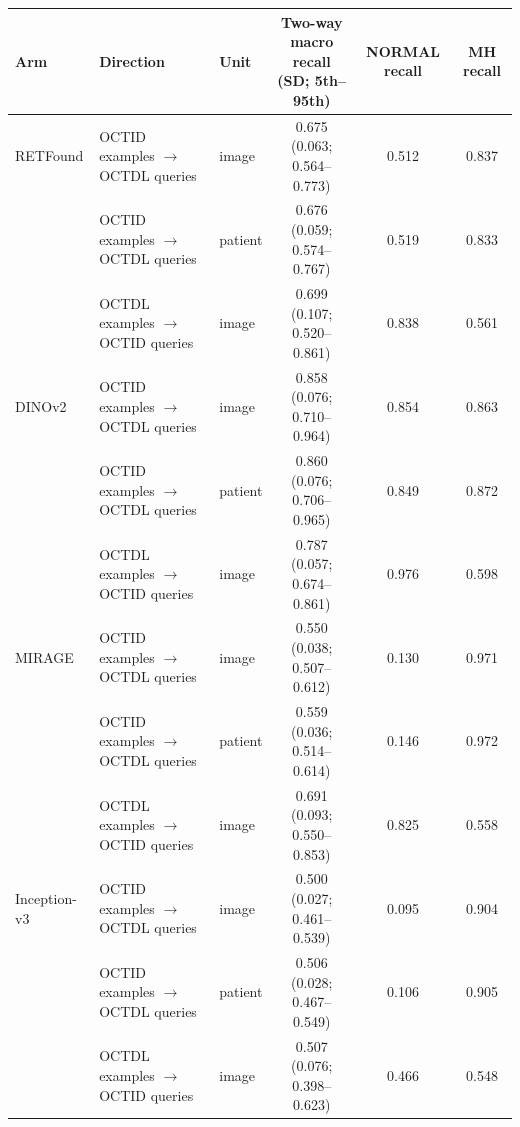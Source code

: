 \begin{tabular}{@{}lllccc@{}}
\toprule
Arm & Direction & Unit & \makecell{Two-way macro recall\\(SD; 5th--95th)} & NORMAL recall & MH recall \\
\midrule
RETFound & OCTID examples $\to$ OCTDL queries & image & 0.675 (0.063; 0.564--0.773) & 0.512 & 0.837 \\
 & OCTID examples $\to$ OCTDL queries & patient & 0.676 (0.059; 0.574--0.767) & 0.519 & 0.833 \\
 & OCTDL examples $\to$ OCTID queries & image & 0.699 (0.107; 0.520--0.861) & 0.838 & 0.561 \\
\addlinespace[2pt]
DINOv2 & OCTID examples $\to$ OCTDL queries & image & 0.858 (0.076; 0.710--0.964) & 0.854 & 0.863 \\
 & OCTID examples $\to$ OCTDL queries & patient & 0.860 (0.076; 0.706--0.965) & 0.849 & 0.872 \\
 & OCTDL examples $\to$ OCTID queries & image & 0.787 (0.057; 0.674--0.861) & 0.976 & 0.598 \\
\addlinespace[2pt]
MIRAGE & OCTID examples $\to$ OCTDL queries & image & 0.550 (0.038; 0.507--0.612) & 0.130 & 0.971 \\
 & OCTID examples $\to$ OCTDL queries & patient & 0.559 (0.036; 0.514--0.614) & 0.146 & 0.972 \\
 & OCTDL examples $\to$ OCTID queries & image & 0.691 (0.093; 0.550--0.853) & 0.825 & 0.558 \\
\addlinespace[2pt]
Inception-v3 & OCTID examples $\to$ OCTDL queries & image & 0.500 (0.027; 0.461--0.539) & 0.095 & 0.904 \\
 & OCTID examples $\to$ OCTDL queries & patient & 0.506 (0.028; 0.467--0.549) & 0.106 & 0.905 \\
 & OCTDL examples $\to$ OCTID queries & image & 0.507 (0.076; 0.398--0.623) & 0.466 & 0.548 \\
\bottomrule
\end{tabular}
